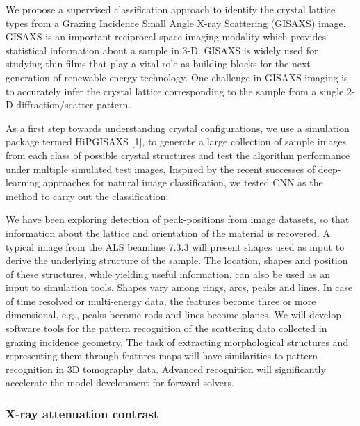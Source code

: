We propose a supervised classification approach to identify the crystal lattice types from a Grazing Incidence Small Angle X-ray Scattering (GISAXS) image. GISAXS is an important reciprocal-space imaging modality which provides statistical information about a sample in 3-D. GISAXS is widely used for
studying thin films that play a vital role as building blocks for the next generation of renewable energy technology. One challenge in GISAXS imaging is to accurately infer the crystal lattice corresponding to the sample from a single 2-D diffraction/scatter pattern.

As a first step towards understanding crystal configurations, we use a simulation package termed HiPGISAXS [1], to generate a large collection of sample images from each class of possible crystal structures and test the algorithm performance under multiple simulated test images. Inspired by the
recent successes of deep-learning approaches for natural image classification, we tested CNN as the method to carry out the classification.

We have been exploring detection of peak-positions from image datasets, so that information about the lattice and orientation of the material is recovered. A typical image from the ALS beamline 7.3.3 will present shapes used as input to derive the underlying structure of the sample. The location, shapes and position of these structures, while yielding useful information, can also be used as an input to simulation tools. Shapes vary among rings, arcs, peaks and lines. In case of time resolved or multi-energy data, the features become three or more dimensional, e.g., peaks become rods and lines become planes. We will develop software tools for the pattern recognition of the scattering data collected in grazing incidence geometry. The task of extracting morphological structures and representing them through features maps will have similarities to pattern recognition in 3D tomography data. Advanced recognition will significantly accelerate the model development for forward solvers.  

\subsubsection{X-ray attenuation contrast}\label{subsec:microct}

\cite{IEEEBigData:2014}


